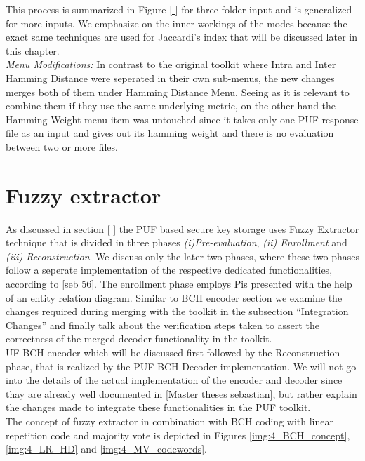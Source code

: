 This process is summarized in Figure \ref{ } for three folder input and is generalized for more inputs. We emphasize on the inner workings of the modes because the exact same techniques are used for Jaccardi's index that will be discussed later in this chapter.\\

\emph{Menu Modifications:} In contrast to the original toolkit where Intra and Inter Hamming Distance were seperated in their own sub-menus, the new changes merges both of them under Hamming Distance Menu. Seeing as it is relevant to combine them if they use the same underlying metric, on the other hand the Hamming Weight menu item was untouched since it takes only one PUF response file as an input and gives out its hamming weight and there is no evaluation between two or
more files.\\


\section{Fuzzy extractor}
As discussed in section \ref{ } the PUF based secure key storage uses Fuzzy Extractor technique that is divided in three phases \emph{(i)Pre-evaluation}, \emph{(ii) Enrollment} and \emph{(iii) Reconstruction}. We discuss only the later two phases, where these two phases follow a seperate implementation of the respective dedicated functionalities, according to [seb 56]. The enrollment phase employs Pis presented with the help of an entity relation diagram. Similar to BCH encoder
section we examine the changes required during merging with the toolkit in the subsection ``Integration Changes'' and finally talk about the verification steps taken to assert the correctness of the merged decoder functionality in the toolkit.\\UF BCH encoder which will be discussed first followed by the Reconstruction phase, that is
realized by the PUF BCH Decoder implementation. We will not go into the details of the actual implementation of the encoder and decoder since thay are already well documented in [Master theses sebastian], but rather explain the changes made to integrate these functionalities in the PUF toolkit.\\

The concept of fuzzy extractor in combination with BCH coding with linear repetition code and majority vote is depicted in Figures \ref{img:4_BCH_concept}, \ref{img:4_LR_HD} and \ref{img:4_MV_codewords}.\pagebreak

